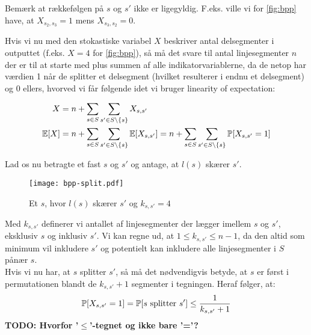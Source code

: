 Bemærk at rækkefølgen på $s$ og $s'$ ikke er ligegyldig. F.eks. ville vi for \ref{fig:bpp} have, at $X_{s_2, s_3} = 1$ mens $X_{s_3, s_2} = 0$.

Hvis vi nu med den stokastiske variabel $X$ beskriver antal delsegmenter i outputtet (f.eks. $X = 4$ for \ref{fig:bpp}), så må det svare til antal linjesegmenter $n$ der er til at starte med plus summen af alle indikatorvariablerne, da de netop har værdien 1 når de splitter et delsegment (hvilket resulterer i endnu et delsegment) og 0 ellers, hvorved vi får følgende idet vi bruger linearity of expectation:

\begin{align}
    X     &= n + \sum_{s \in S} \sum_{s' \in S \backslash \{ s\}} X_{s, s'} \nonumber \\
    \e[X] &= n + \sum_{s \in S} \sum_{s' \in S \backslash \{ s\}} \e[X_{s, s'}]
           = n + \sum_{s \in S} \sum_{s' \in S \backslash \{ s\}} \P[X_{s, s'} = 1] \label{eq:bpp-X-init}
\end{align}

Lad os nu betragte et fast $s$ og $s'$ og antage, at $l(s)$ skærer $s'$.
\begin{figure}[H]
    \begin{center}
    \texttt{[image: bpp-split.pdf]}
    \end{center}
    \caption{Et $s$, hvor $l(s)$ skærer $s'$ og $k_{s, s'} = 4$}
    \label{fig:bpp-split}
\end{figure}


Med $k_{s, s'}$ definerer vi antallet af linjesegmenter der lægger imellem $s$ og $s'$, eksklusiv $s$ og inklusiv $s'$. Vi kan regne ud, at $1 \leq k_{s, s'} \leq n-1$, da den altid som minimum vil inkludere $s'$ og potentielt kan inkludere alle linjesegmenter i $S$ pånær $s$.\\

Hvis vi nu har, at $s$ splitter $s'$, så må det nødvendigvis betyde, at $s$ er først i permutationen blandt de $k_{s, s'} + 1$ segmenter i tegningen. Heraf følger, at:
\begin{align} \label{eq:bpp-prob-split}
    \P[X_{s, s'} = 1] = \P[\text{$s$ splitter $s'$}] \leq \frac{1}{k_{s, s'} + 1}
\end{align}
\textbf{TODO: Hvorfor '$\leq$'-tegnet og ikke bare '='?}


